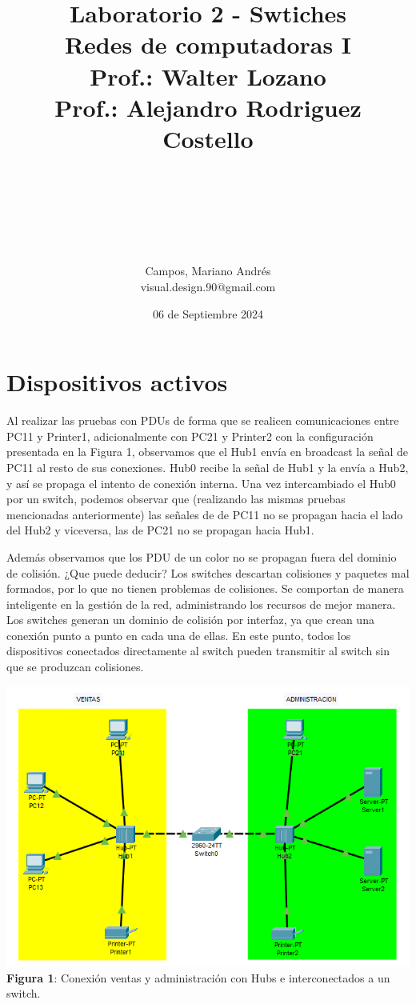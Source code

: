 \documentclass{article}
\title{\bfseries \huge Laboratorio 2 - Swtiches \normalsize{\linebreak\\Redes de computadoras I \\Prof.: Walter Lozano\\Prof.: Alejandro Rodriguez Costello}}
\author{\\\\\\\\\\\\Campos, Mariano Andrés \\ {\small visual.design.90@gmail.com}}
\date{\small 06 de Septiembre 2024}
\begin{document}
    \maketitle
    \newpage

    \section{Dispositivos activos}
    Al realizar las pruebas con PDUs de forma que se realicen comunicaciones entre PC11 y Printer1, adicionalmente con PC21 y Printer2 con la configuración presentada en la Figura 1, observamos que el Hub1 envía en broadcast la señal de PC11 al resto de sus conexiones. Hub0 recibe la señal de Hub1 y la envía a Hub2, y así se propaga el intento de conexión interna. 
    Una vez intercambiado el Hub0 por un switch, podemos observar que (realizando las mismas pruebas mencionadas anteriormente) las señales de de PC11 no se propagan hacia el lado del Hub2 y viceversa, las de PC21 no se propagan hacia Hub1.

    Además observamos que los PDU de un color no se propagan fuera del dominio de colisión.
    ¿Que puede deducir? 
    \linebreak
    Los switches descartan colisiones y paquetes mal formados, por lo que no tienen problemas de colisiones. Se comportan de manera inteligente en la gestión de la red, administrando los recursos de mejor manera. Los switches generan un dominio de colisión por interfaz, ya que crean una conexión punto a punto en cada una de ellas. En este punto, todos los dispositivos conectados directamente al switch pueden transmitir al switch sin que se produzcan colisiones.
    
    \begin{center}
        \includegraphics[width=0.85\linewidth]{img_02} 
        \linebreak
        \small {\bfseries Figura 1}: Conexión ventas y administración con Hubs e interconectados a un switch.
    \end{center}
    \pagebreak
    
\end{document}
